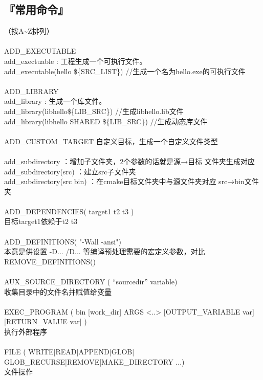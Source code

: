 \documentclass[11pt,a4paper,titlepage]{article}
\begin{document}
\subsection{\kai 『常用命令』}
（按A\~{}Z排列）\\
\\
ADD\_EXECUTABLE\\
add\_exectuable  : 工程生成一个可执行文件。\\
add\_executable(hello \$\{SRC\_LIST\})  //生成一个名为hello.exe的可执行文件\\
\\
ADD\_LIBRARY\\
add\_library :  生成一个库文件。\\
add\_library(libhello\$\{LIB\_SRC\})  //生成libhello.lib文件\\
add\_library(libhello SHARED \$\{LIB\_SRC\})  //生成动态库文件\\
\\
ADD\_CUSTOM\_TARGET
自定义目标，生成一个自定义文件类型\\
\\
add\_subdirectory ：增加子文件夹，2个参数的话就是源→目标 文件夹生成对应 \\
add\_subdirectory(src) ：建立src子文件夹\\
add\_subdirectory(src bin)  ：在cmake目标文件夹中与源文件夹对应 src→bin文件夹\\
\\
ADD\_DEPENDENCIES( target1 t2 t3 )\\
目标target1依赖于t2 t3\\
\\
ADD\_DEFINITIONS( "-Wall -ansi")\\
本意是供设置 -D... /D... 等编译预处理需要的宏定义参数，对比 REMOVE\_DEFINITIONS()\\
\\
AUX\_SOURCE\_DIRECTORY ( “sourcedir” variable)\\
收集目录中的文件名并赋值给变量\\
\\
EXEC\_PROGRAM ( bin [work\_dir] ARGS <..> [OUTPUT\_VARIABLE var] [RETURN\_VALUE var] )\\
 执行外部程序\\
\\
FILE ( WRITE|READ|APPEND|GLOB| GLOB\_RECURSE|REMOVE|MAKE\_DIRECTORY ...)\\
文件操作\\
\\
\end{document}
